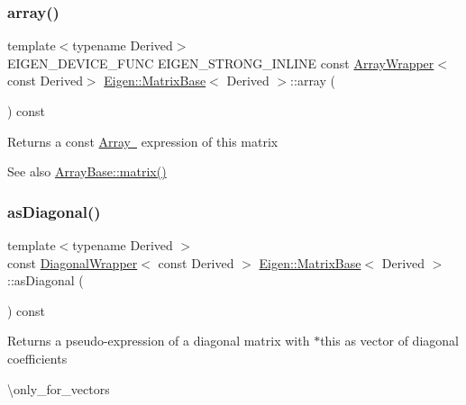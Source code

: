 \subsubsection{\texorpdfstring{array()}{array()}\hspace{0.1cm}{\footnotesize\ttfamily [2/2]}}
{\footnotesize\ttfamily template$<$typename Derived$>$ \\
E\+I\+G\+E\+N\+\_\+\+D\+E\+V\+I\+C\+E\+\_\+\+F\+U\+NC E\+I\+G\+E\+N\+\_\+\+S\+T\+R\+O\+N\+G\+\_\+\+I\+N\+L\+I\+NE const \mbox{\hyperlink{class_eigen_1_1_array_wrapper}{Array\+Wrapper}}$<$const Derived$>$ \mbox{\hyperlink{class_eigen_1_1_matrix_base}{Eigen\+::\+Matrix\+Base}}$<$ Derived $>$\+::array (\begin{DoxyParamCaption}{ }\end{DoxyParamCaption}) const\hspace{0.3cm}{\ttfamily [inline]}}

\begin{DoxyReturn}{Returns}
a const \mbox{\hyperlink{class_eigen_1_1_array_base}{Array }} expression of this matrix 
\end{DoxyReturn}
\begin{DoxySeeAlso}{See also}
\mbox{\hyperlink{class_eigen_1_1_array_base_ac513167ec762bbf639dc375d314d91d3}{Array\+Base\+::matrix()}} 
\end{DoxySeeAlso}
\mbox{\label{class_eigen_1_1_matrix_base_a14235b62c90f93fe910070b4743782d0}} 
\subsubsection{\texorpdfstring{asDiagonal()}{asDiagonal()}}
{\footnotesize\ttfamily template$<$typename Derived $>$ \\
const \mbox{\hyperlink{class_eigen_1_1_diagonal_wrapper}{Diagonal\+Wrapper}}$<$ const Derived $>$ \mbox{\hyperlink{class_eigen_1_1_matrix_base}{Eigen\+::\+Matrix\+Base}}$<$ Derived $>$\+::as\+Diagonal (\begin{DoxyParamCaption}{ }\end{DoxyParamCaption}) const\hspace{0.3cm}{\ttfamily [inline]}}

\begin{DoxyReturn}{Returns}
a pseudo-\/expression of a diagonal matrix with $\ast$this as vector of diagonal coefficients
\end{DoxyReturn}
\textbackslash{}only\+\_\+for\+\_\+vectors

